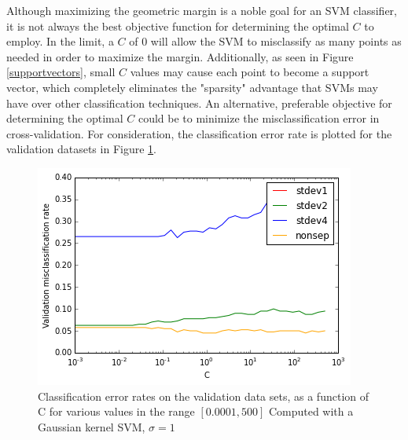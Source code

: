 \documentclass[10pt]{article}
\begin{document}
Although maximizing the geometric margin is a noble goal for an SVM classifier, it is not always the best objective function for determining the optimal $C$ to employ.  In the limit, a $C$ of $0$ will allow the SVM to misclassify as many points as needed in order to maximize the margin.  Additionally, as seen in Figure \ref{supportvectors}, small $C$ values may cause each point to become a support vector, which completely eliminates the "sparsity" advantage that SVMs may have over other classification techniques. An alternative, preferable objective for determining the optimal $C$ could be to minimize the misclassification error in cross-validation.  For consideration, the classification error rate is plotted for the validation datasets in Figure \ref{cer_svm}.
\begin{figure}
\centering
\includegraphics[scale=0.5]{cer_svm.png}

\caption{Classification error rates on the validation data sets, as a function of C for various values in the range $[0.0001, 500]$ Computed with a Gaussian kernel SVM, $\sigma=1$}
\label{cer_svm}
\end{figure}
\end{document}
